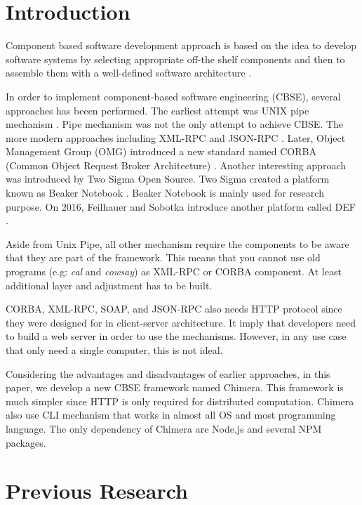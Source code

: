 \documentclass[conference]{IEEEtran}
\begin{document}
\IEEEpeerreviewmaketitle

\section{Introduction}

Component based software development approach is based on the idea to develop 
software systems by selecting appropriate off-the shelf components and then to 
assemble them with a well-defined software architecture \cite{kaur2010component}.

In order to implement component-based software engineering (CBSE), several 
approaches has beeen performed. The earliest attempt was UNIX pipe mechanism 
\cite{mcilroy1968mass}. Pipe mechanism was not the only attempt to achieve CBSE.
The more modern approaches including XML-RPC \cite{xmlrpc} and JSON-RPC \cite{jsonrpc}. 
Later, Object Management Group (OMG) introduced a new standard named CORBA (Common
Object Request Broker Architecture) \cite{corba}. Another interesting approach was 
introduced by Two Sigma Open Source. Two Sigma created a platform known as Beaker
Notebook \cite{beakernotebook}. Beaker Notebook is mainly used for research purpose. 
On 2016, Feilhauer and Sobotka introduce another platform called DEF 
\cite{feilhauer2016def}.

Aside from Unix Pipe, all other mechanism require the components to be aware that 
they are part of the framework. This means that you cannot use old programs (e.g:
{\it cal} and {\it cowsay}) as XML-RPC or CORBA component. At least additional layer
and adjustment has to be built.

CORBA, XML-RPC, SOAP, and JSON-RPC also needs HTTP protocol since they were designed for 
in client-server architecture. It imply that developers need to build a web server in 
order to use the mechanisms. However, in any use case that only need a single computer,
this is not ideal.

Considering the advantages and disadvantages of earlier approaches, in this paper, 
we develop a new CBSE framework named Chimera. This framework is much simpler since
HTTP is only required for distributed computation. Chimera also use CLI mechanism that
works in almost all OS and most programming language.
The only dependency of Chimera are Node.js and several NPM packages.

\section{Previous Research}
\end{document}

